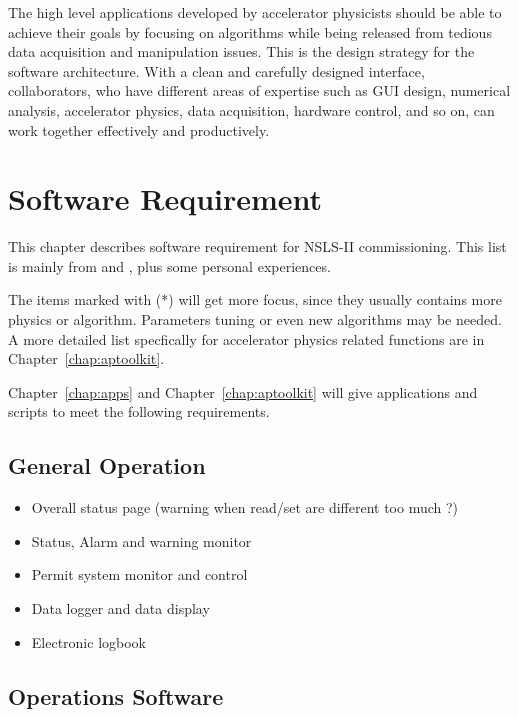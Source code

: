 \documentclass[11pt,oneside,letterpaper,showtrims,article]{memoir}
\begin{document}
The high level applications developed by accelerator physicists should
be able to achieve their goals by focusing on algorithms while being
released from tedious data acquisition and manipulation issues. This
is the design strategy for the software architecture. With a clean and
carefully designed interface, collaborators, who have different areas
of expertise such as GUI design, numerical analysis, accelerator
physics, data acquisition, hardware control, and so on, can work
together effectively and productively.

\chapter{Software Requirement}

This chapter describes software requirement for NSLS-II
commissioning. This list is mainly from \cite{willeke_2009_assumptions}
and \cite{krinsky_2010_nsls-ii}, plus some personal experiences.

The items marked with (*) will get more focus, since they usually contains
more physics or algorithm. Parameters tuning or even new algorithms may be
needed. A more detailed list specfically for accelerator physics related
functions are in Chapter~\ref{chap:aptoolkit}.

Chapter~\ref{chap:apps} and Chapter~\ref{chap:aptoolkit} will give
applications and scripts to meet the following requirements.

\section{General Operation}

\begin{itemize}
\item Overall status page (warning when read/set are different too much ?)
\item Status, Alarm and warning monitor
\item Permit system monitor and control
\item Data logger and data display
\item Electronic logbook
\end{itemize}

\section{Operations Software}
\end{document}
